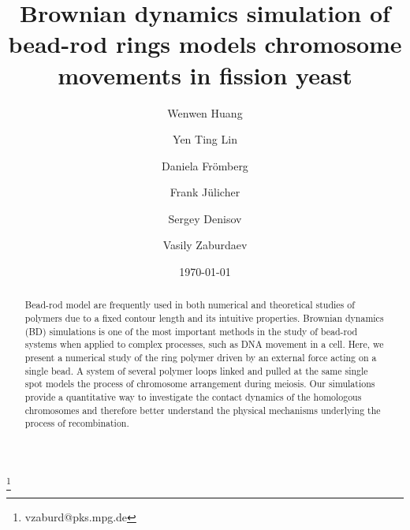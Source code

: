 \documentclass{article}
\begin{document}
\title{Brownian dynamics simulation of bead-rod rings models chromosome movements in fission yeast}

\author[a]{Wenwen Huang}
\author[a]{Yen Ting Lin}
\author[a]{Daniela Fr\"{o}mberg}
\author[a]{Frank J\"{u}licher}
\author[a,b]{Sergey Denisov}
\author[a]{Vasily Zaburdaev}\thanks{vzaburd@pks.mpg.de}
\date{\today}

\begin{abstract}

Bead-rod model are frequently used in both numerical and theoretical studies of polymers due to a fixed contour length and its intuitive properties. Brownian dynamics (BD) simulations is one of the most important methods in the study of bead-rod systems when applied to complex processes, such as DNA movement in a cell. Here, we present a numerical study of the ring polymer driven by an external force acting on a single bead. A system of several polymer loops linked and pulled at the same single spot models the process of chromosome arrangement during meiosis. Our simulations provide a quantitative way to investigate the contact dynamics of the homologous chromosomes and therefore better understand the physical mechanisms underlying the process of recombination. 

\end{abstract}
\maketitle
\end{document}
